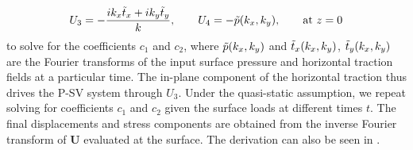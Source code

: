 \documentclass[11pt]{article}
\begin{document}
\begin{large}
\begin{equation}
    U_3 = -\frac{ik_x \Tilde{t}_x + ik_y \Tilde{t}_y}{k},\qquad U_4 = -\Tilde{p}(k_x, k_y),\qquad \text{at}\,\,z=0
\label{eq:bc_psv}
\end{equation}
to solve for the coefficients $c_1$ and $c_2$, where $\Tilde{p}(k_x,k_y)$ and $\Tilde{t}_x(k_x,k_y)$, $\Tilde{t}_y(k_x,k_y)$ are the Fourier transforms of the input surface pressure and horizontal traction fields at a particular time. The in-plane component of the horizontal traction thus drives the P-SV system through $U_3$. Under the quasi-static assumption, we repeat solving for coefficients $c_1$ and $c_2$ given the surface loads at different times $t$. The final displacements and stress components are obtained from the inverse Fourier transform of $\mathbf{U}$ evaluated at the surface. The derivation can also be seen in \cite{segall_2010}.


\end{large}
\end{document}
